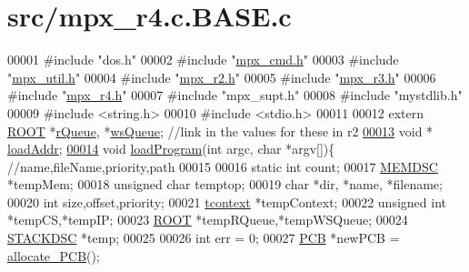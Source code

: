 \hypertarget{mpx__r4_8c_8_b_a_s_e_8c_source}{
\section{src/mpx\_\-r4.c.BASE.c}
}

\begin{DoxyCode}
00001 \textcolor{preprocessor}{#include "dos.h"}
00002 \textcolor{preprocessor}{#include "\hyperlink{mpx__cmd_8h}{mpx_cmd.h}"}
00003 \textcolor{preprocessor}{#include "\hyperlink{mpx__util_8h}{mpx_util.h}"}
00004 \textcolor{preprocessor}{#include "\hyperlink{mpx__r2_8h}{mpx_r2.h}"}
00005 \textcolor{preprocessor}{#include "\hyperlink{_m_p_x___r3_8_h}{mpx_r3.h}"}
00006 \textcolor{preprocessor}{#include "\hyperlink{mpx__r4_8h}{mpx_r4.h}"}
00007 \textcolor{preprocessor}{#include "mpx\_supt.h"}
00008 \textcolor{preprocessor}{#include "mystdlib.h"}
00009 \textcolor{preprocessor}{#include <string.h>}
00010 \textcolor{preprocessor}{#include <stdio.h>}
00011 
00012 \textcolor{keyword}{extern} \hyperlink{structroot}{ROOT} *\hyperlink{mpx__r2_8c_afe54c168944e64a28d76b6e4d3abb391}{rQueue}, *\hyperlink{mpx__r2_8c_ac4950750e25f86d7ee69d6bcca87ef5f}{wsQueue}; \textcolor{comment}{//link in the values for these in r2}
\hypertarget{mpx__r4_8c_8_b_a_s_e_8c_source_l00013}{}\hyperlink{mpx__r4_8c_8_b_a_s_e_8c_a872ebd998619bdbaa3b905883e648502}{00013} \textcolor{keywordtype}{void} * \hyperlink{mpx__r4_8c_a872ebd998619bdbaa3b905883e648502}{loadAddr};
\hypertarget{mpx__r4_8c_8_b_a_s_e_8c_source_l00014}{}\hyperlink{mpx__r4_8c_8_b_a_s_e_8c_a794e5f6c45d4d9b18fff6a530ce90f86}{00014} \textcolor{keywordtype}{void} \hyperlink{mpx__r4_8c_a794e5f6c45d4d9b18fff6a530ce90f86}{loadProgram}(\textcolor{keywordtype}{int} argc, \textcolor{keywordtype}{char} *argv[])\{ \textcolor{comment}{//name,fileName,priority,path}
00015         
00016         \textcolor{keyword}{static} \textcolor{keywordtype}{int} count;
00017         \hyperlink{structmem}{MEMDSC} *tempMem;
00018         \textcolor{keywordtype}{unsigned} \textcolor{keywordtype}{char} temptop;
00019         \textcolor{keywordtype}{char} *dir, *name, *filename;
00020         \textcolor{keywordtype}{int} size,offset,priority;
00021         \hyperlink{structcontext}{tcontext} *tempContext;
00022         \textcolor{keywordtype}{unsigned} \textcolor{keywordtype}{int} *tempCS,*tempIP;
00023         \hyperlink{structroot}{ROOT} *tempRQueue,*tempWSQueue;
00024         \hyperlink{structstack}{STACKDSC} *temp;
00025         
00026         \textcolor{keywordtype}{int} err = 0;
00027         \hyperlink{structprocess}{PCB} *newPCB = \hyperlink{mpx__r2_8c_a58a8a1ea0a96b9ecf0be29179a5a0a1e}{allocate_PCB}();

\end{DoxyCode}
